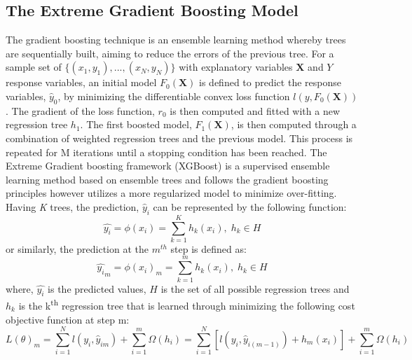 \documentclass[]{interact}
\theoremstyle{plain}%
\theoremstyle{definition}
\theoremstyle{remark}
\begin{document}
\subsection{The Extreme Gradient Boosting Model}\label{XGBoostSubsection}
The gradient boosting technique is an ensemble learning method whereby trees are sequentially built, aiming to reduce the errors of the previous tree. For a sample set of $\{(x_1,y_1),...,(x_N,y_N)\}$ with explanatory variables $\boldsymbol{X}$ and $Y$ response variables, an initial model $F_0(\boldsymbol{X})$ is defined to predict the response variables, $\hat{y}_0$, by minimizing the differentiable convex loss function $l(y,F_0(\boldsymbol{X}))$. The gradient of the loss function, $r_0$ is then computed and fitted with a new regression tree $h_1$. The first boosted model, $F_1(\boldsymbol{X})$, is then computed through a combination of weighted regression trees and the previous model. This process is repeated for M iterations until a stopping condition has been reached. The Extreme Gradient boosting framework (XGBoost) is a supervised ensemble learning method based on ensemble trees and follows the gradient boosting principles however utilizes a more regularized model to minimize over-fitting. Having \textit{K} trees, the prediction, $\hat{y}_i$ can be represented by the following function:
\begin{equation}
    \hat{y_i} = \phi(x_i)=\sum_{k=1}^{K}h_k(x_i), \; h_k \in H
\end{equation}
or similarly, the prediction at the $m^{th}$ step is defined as:
\begin{equation}
    \hat{y_i}_m = \phi(x_i)_m=\sum_{k=1}^{m}h_k(x_i), \; h_k \in H
\end{equation}
where, $\hat{y_i}$ is the predicted values, $H$ is the set of all possible regression trees and $h_k$ is the k\textsuperscript{th} regression tree that is learned through minimizing the following cost objective function at step m:
\begin{equation}\label{XGBoostObj}
    L(\theta)_m = \sum_{i=1}^{N}l(y_i,\hat{y}_{im}) + \sum_{i=1}^{m}\Omega(h_i) = \sum_{i=1}^{N}\left[l(y_i,\hat{y}_{i(m-1)})+ h_m(x_i)\right] + \sum_{i=1}^m\Omega(h_i)
\end{equation}
\end{document}
